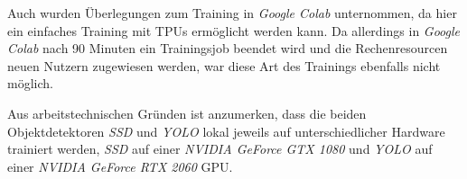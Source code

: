 Auch wurden Überlegungen zum Training in \textit{Google Colab} unternommen, da hier ein einfaches Training mit TPUs ermöglicht werden kann. Da allerdings in \textit{Google Colab} nach 90 Minuten ein Trainingsjob beendet wird und die Rechenresourcen neuen Nutzern zugewiesen werden, war diese Art des Trainings ebenfalls nicht möglich. 

Aus arbeitstechnischen Gründen ist anzumerken, dass die beiden Objektdetektoren \textit{SSD} und \textit{YOLO} lokal jeweils auf unterschiedlicher Hardware trainiert werden, \textit{SSD} auf einer \textit{NVIDIA GeForce GTX 1080} und \textit{YOLO} auf einer \textit{NVIDIA GeForce RTX 2060} GPU.
